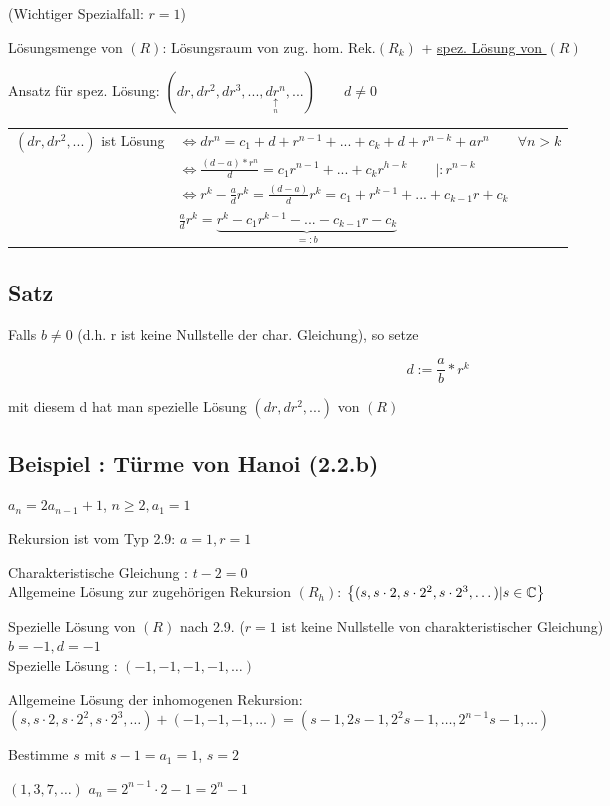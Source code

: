 (Wichtiger Spezialfall: $r=1$)

Lösungsmenge von $(R)$: Lösungsraum von zug. hom. Rek.$(R_k)$ + \underline{spez. Lösung von $(R)$}

Ansatz für spez. Lösung: $(dr,dr^2,dr^3,..., \underset{ \underset{n} { \uparrow }}{dr^n},...) \qquad d \neq 0$

\begin{tabular}{l l}
$(dr,dr^2,...)$ ist Lösung &$\Leftrightarrow dr^n = c_1+d+r^{n-1}+...+c_k+d+r^{n-k}+ar^n \qquad \forall n> k$\\
& $\Leftrightarrow \frac{(d-a)*r^n}{d}=c_1r^{n-1}+...+c_kr^{h-k} \qquad | :r^{n-k}$\\
& $\Leftrightarrow r^k - \frac{a}{d}r^k=\frac{(d-a)}{d}r^k=c_1+r^{k-1}+...+c_{k-1}r+c_k$ \\
& $\frac{a}{d} r^k = \underbrace{r^k-c_1r^{k-1}-...-c_{k-1}r-c_k}_{=:b}$
\end{tabular}
 
\subsection{Satz}
Falls $b\neq 0$ (d.h. r ist keine Nullstelle der char. Gleichung), so setze

$$ d:= \frac{a}{b}*r^k$$

mit diesem d hat man spezielle Lösung $(dr,dr^2,...)$ von $(R)$


\subsection{Beispiel : Türme von Hanoi (2.2.b)} %

$a_n = 2a_{n-1} + 1$, $n \geq 2, a_1 = 1$

Rekursion ist vom Typ 2.9: %
$a = 1, r = 1$

Charakteristische Gleichung : $t-2 = 0$
\\Allgemeine Lösung zur zugehörigen Rekursion $(R_h)$:
$\left\{(s, s\cdot 2, s\cdot2^2, s \cdot2^3, \dots) | s \in \operatorname{\mathbb{C}}\right\}$

Spezielle Lösung von $(R)$ nach 2.9. %
($r=1$ ist keine Nullstelle von charakteristischer Gleichung)
\\ $b = -1, d = -1$
\\ Spezielle Lösung : $(-1, -1, -1, -1, \dots)$

Allgemeine Lösung der inhomogenen Rekursion: 
\\$(s, s\cdot 2, s\cdot2^2, s\cdot2^3, \dots) + (-1, -1, -1, \dots)
= (s-1, 2s-1, 2^2s-1, \dots, 2^{n-1}s-1, \dots)$

Bestimme $s$ mit $s-1 = a_1 = 1$, $s=2$

$(1, 3, 7, \dots)$ \qquad
$a_n = 2^{n-1}\cdot2-1=2^n-1$
















